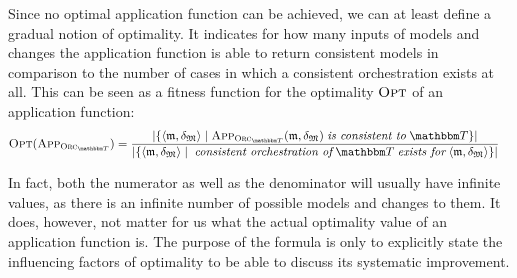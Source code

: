Since no optimal application function can be achieved, we can at least define a gradual notion of optimality.
It indicates for how many inputs of models and changes the application function is able to return consistent models in comparison to the number of cases in which a consistent orchestration exists at all.
This can be seen as a fitness function for the optimality $\textsc{Opt}$ of an application function:
\begin{align*}
    &
    \function{Opt}(\appfunction{\orcfunction{\transformationset{T}}}) = \frac{
        \abs{\setted{%
        \tupled{\modeltuple{m},\changetuple{\metamodeltuple{M}}} \mid \appfunction{\orcfunction{\transformationset{T}}}(\modeltuple{m}, \changetuple{\metamodeltuple{M}}) \mathtext{is consistent to} \transformationset{T}}}
    }{
        \abs{\setted{\tupled{\modeltuple{m},\changetuple{\metamodeltuple{M}}} \mid \mathtext{consistent orchestration of} \transformationset{T} \mathtext{exists for} \tupled{\modeltuple{m}, \changetuple{\metamodeltuple{M}}}}}
    }
\end{align*}

In fact, both the numerator as well as the denominator will usually have infinite values, as there is an infinite number of possible models and changes to them.
It does, however, not matter for us what the actual optimality value of an application function is.
The purpose of the formula is only to explicitly state the influencing factors of optimality to be able to discuss its systematic improvement.

